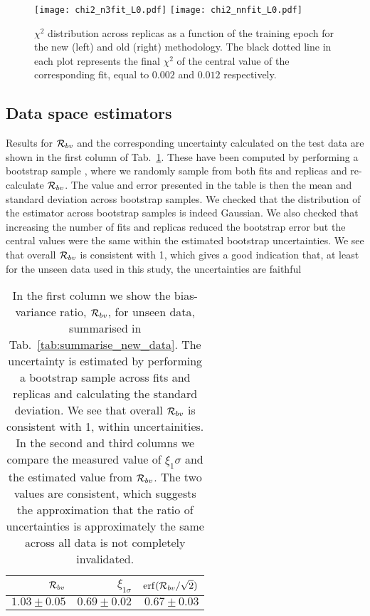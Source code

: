 \begin{figure}[h]
    \centering
    \texttt{[image: chi2\_n3fit\_L0.pdf]}
    \texttt{[image: chi2\_nnfit\_L0.pdf]}
    \caption{$\chi^2$ distribution across replicas as a function of the training epoch for the new (left)
    and old (right) methodology. The black dotted line in each plot represents the final 
    $\chi^2$ of the central value of the corresponding fit, equal to $0.002$ and $0.012$ respectively.}
    \label{fig:chi2_vs_epoch}    
\end{figure}



\subsection{Data space estimators}

Results for $\mathcal{R}_{bv}$ and the corresponding uncertainty calculated on the test data are shown in
 the first column of Tab.~\ref{tab:biasvarratio}. These have been computed by performing a bootstrap sample
\cite{efron1994introduction}, where we randomly sample from both fits and replicas and re-calculate
$\mathcal{R}_{bv}$. The value and error presented in the table is then the mean
and standard deviation across bootstrap samples. We checked that the distribution
of the estimator across bootstrap samples is indeed Gaussian. We also checked
that increasing the number of fits and replicas reduced the bootstrap error but
the central values were the same within the estimated bootstrap uncertainties. 
We see that overall $\mathcal{R}_{bv}$  is consistent with 1, which
gives a good indication that, at least for the unseen data used in this study, the uncertainties are
faithful

\begin{table}[h]
    \begin{center}
        \setlength{\tabcolsep}{12pt} 
        \begin{tabular}{rrr}
            \toprule
             $\mathcal{R}_{bv}$ & $\xi_{1\sigma}$ & ${\rm erf}(\mathcal{R}_{bv}/\sqrt{2})$ \\
            \midrule
             $1.03\pm0.05$ & $0.69\pm0.02$   & $0.67\pm0.03$                  \\
            \bottomrule
            \end{tabular}
    \end{center}
    \caption{
        In the first column we show the bias-variance ratio, $\mathcal{R}_{bv}$, for unseen data, summarised in
        Tab.~\ref{tab:summarise_new_data}. The uncertainty is estimated by
        performing a bootstrap sample across fits and replicas and calculating
        the standard deviation. We see that overall $\mathcal{R}_{bv}$ is consistent
        with 1, within uncertainities. 
        In the second and third columns we compare the measured value of $\xi_1\sigma$ and the estimated
        value from $\mathcal{R}_{bv}$. The two values are consistent, which
        suggests the approximation that the ratio of uncertainties is
        approximately the same across all data is not completely invalidated.
    }
    \label{tab:biasvarratio}
\end{table}

